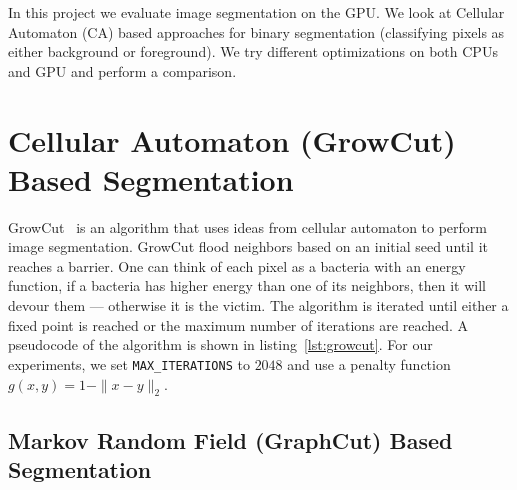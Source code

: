 \documentclass[
10pt, %
letterpaper, %
oneside, %
headinclude,footinclude, %
BCOR5mm, %
]{scrartcl}
\newcommand{\fix}[1]{\texttt{\small #1}}
\begin{document}
In this project we evaluate image segmentation on the GPU.
We look at Cellular Automaton (CA) based 
  approaches for binary segmentation (classifying pixels as either background
  or foreground).
We try different optimizations on both CPUs and GPU and perform a comparison.


\let\thefootnote\relax{}



 


\section{Cellular Automaton (GrowCut) Based Segmentation}

GrowCut~\cite{vezhnevets2005growcut} is an algorithm that uses ideas from cellular automaton to perform image
  segmentation.
GrowCut flood
  neighbors based on an initial seed until it reaches a barrier.
One can think of each pixel as a bacteria with an energy function, if a bacteria has
  higher energy than one of its neighbors, then it will devour them --- otherwise it
  is the victim.
The algorithm is iterated until either a fixed point is reached or the maximum number
  of iterations are reached.
A pseudocode of the algorithm is shown in listing~\ref{lst:growcut}.
For our experiments, we set \fix{MAX\_ITERATIONS} to $2048$ and use a
  penalty function $g(x,y)  = 1 - \|x - y\|_2$.




\subsection{Markov Random Field (GraphCut) Based Segmentation}
\end{document}
